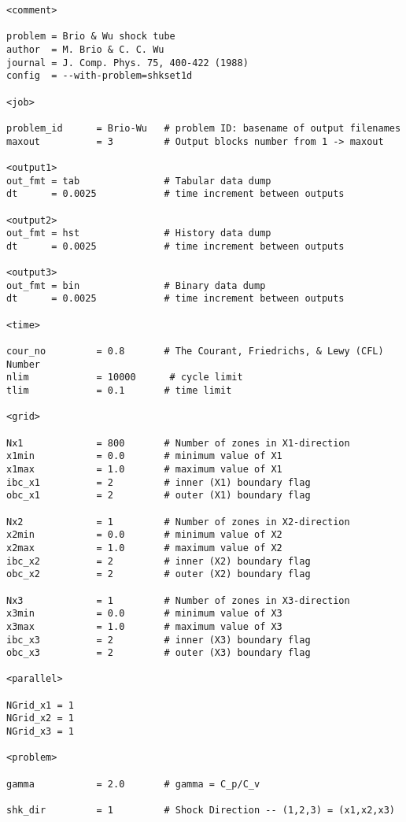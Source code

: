 \footnotesize
\begin{verbatim}
<comment>

problem = Brio & Wu shock tube
author  = M. Brio & C. C. Wu 
journal = J. Comp. Phys. 75, 400-422 (1988)
config  = --with-problem=shkset1d

<job>

problem_id      = Brio-Wu   # problem ID: basename of output filenames
maxout          = 3         # Output blocks number from 1 -> maxout

<output1>
out_fmt = tab               # Tabular data dump
dt      = 0.0025            # time increment between outputs

<output2>
out_fmt = hst               # History data dump
dt      = 0.0025            # time increment between outputs

<output3>
out_fmt = bin               # Binary data dump
dt      = 0.0025            # time increment between outputs

<time>

cour_no         = 0.8       # The Courant, Friedrichs, & Lewy (CFL) Number
nlim            = 10000      # cycle limit
tlim            = 0.1       # time limit

<grid>

Nx1             = 800       # Number of zones in X1-direction
x1min           = 0.0       # minimum value of X1
x1max           = 1.0       # maximum value of X1
ibc_x1          = 2         # inner (X1) boundary flag
obc_x1          = 2         # outer (X1) boundary flag

Nx2             = 1         # Number of zones in X2-direction
x2min           = 0.0       # minimum value of X2
x2max           = 1.0       # maximum value of X2
ibc_x2          = 2         # inner (X2) boundary flag
obc_x2          = 2         # outer (X2) boundary flag

Nx3             = 1         # Number of zones in X3-direction
x3min           = 0.0       # minimum value of X3
x3max           = 1.0       # maximum value of X3
ibc_x3          = 2         # inner (X3) boundary flag
obc_x3          = 2         # outer (X3) boundary flag

<parallel>

NGrid_x1 = 1
NGrid_x2 = 1
NGrid_x3 = 1

<problem>

gamma           = 2.0       # gamma = C_p/C_v

shk_dir         = 1         # Shock Direction -- (1,2,3) = (x1,x2,x3)


\end{verbatim}
